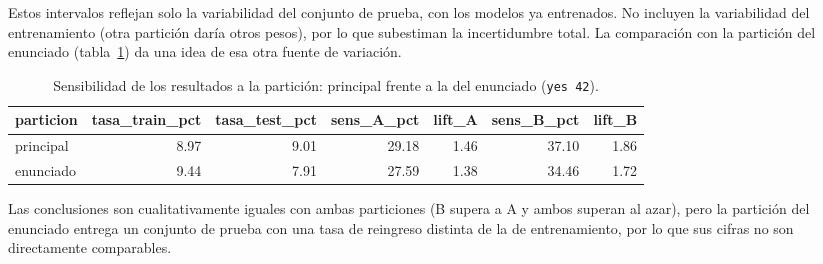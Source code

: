 \documentclass[11pt,a4paper]{article}
\newcommand{\cod}[1]{\texttt{#1}}
\newenvironment{tablaentex}[2]{%
  \begin{table}[H]\centering\small\caption{#1}\label{#2}\begin{adjustbox}{max width=\textwidth}}%
  {\end{adjustbox}\end{table}}
\begin{document}
Estos intervalos reflejan solo la variabilidad del conjunto de prueba, con los modelos ya entrenados. No incluyen la variabilidad del entrenamiento (otra partición daría otros pesos), por lo que subestiman la incertidumbre total. La comparación con la partición del enunciado (tabla~\ref{tab:comp}) da una idea de esa otra fuente de variación.
\begin{tablaentex}{Sensibilidad de los resultados a la partición: principal frente a la del enunciado (\cod{yes 42}).}{tab:comp}
\begin{tabular}{lrrrrrr}
\toprule
particion & tasa\_train\_pct & tasa\_test\_pct & sens\_A\_pct & lift\_A & sens\_B\_pct & lift\_B \\
\midrule
principal & 8.97 & 9.01 & 29.18 & 1.46 & 37.10 & 1.86 \\
enunciado & 9.44 & 7.91 & 27.59 & 1.38 & 34.46 & 1.72 \\
\bottomrule
\end{tabular}
\end{tablaentex}
Las conclusiones son cualitativamente iguales con ambas particiones (B supera a A y ambos superan al azar), pero la partición del enunciado entrega un conjunto de prueba con una tasa de reingreso distinta de la de entrenamiento, por lo que sus cifras no son directamente comparables.
\end{document}
